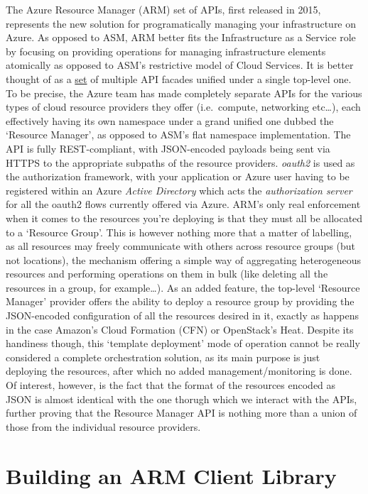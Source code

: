 \documentclass[11pt]{report}
\begin{document}
The Azure Resource Manager (ARM) set of APIs, first released in 2015,
represents the new solution for programatically managing your infrastructure on
Azure. As opposed to ASM, ARM better fits the Infrastructure as a Service
role by focusing on providing operations for managing infrastructure elements
atomically as opposed to ASM's restrictive model of Cloud Services. It is better
thought of as a \underline{set} of multiple API facades unified under a single
top-level one. To be precise, the Azure team has made completely separate APIs
for the various types of cloud resource providers they offer (i.e.\ compute,
networking etc\ldots), each effectively having its own namespace under a grand
unified one dubbed the `Resource Manager', as opposed to ASM's flat namespace
implementation. The API is fully REST-compliant, with JSON-encoded payloads
being sent via HTTPS to the appropriate subpaths of the resource providers.
\textit{oauth2} is used as the authorization framework, with your application
or Azure user having to be registered within an Azure \textit{Active
Directory} which acts the \textit{authorization server} for all the oauth2
flows currently offered via Azure. \newline
ARM's only real enforcement when it comes to the resources you're deploying is
that they must all be allocated to a `Resource Group'. This is however nothing
more that a matter of labelling, as all resources may freely communicate with
others across resource groups (but not locations), the mechanism offering a
simple way of aggregating heterogeneous resources and performing operations on
them in bulk (like deleting all the resources in a group, for example\ldots).
\newline
As an added feature, the top-level `Resource Manager' provider offers the
ability to deploy a resource group by providing the JSON-encoded configuration
of all the resources desired in it, exactly as happens in the case Amazon's
Cloud Formation (CFN) or OpenStack's Heat. Despite its handiness though, this
`template deployment' mode of operation cannot be really considered a complete
orchestration solution, as its main purpose is just deploying the resources,
after which no added management/monitoring is done. Of interest, however, is
the fact that the format of the resources encoded as JSON is almost identical
with the one thorugh which we interact with the APIs, further proving that the
Resource Manager API is nothing more than a union of those from the individual
resource providers.

\section{Building an ARM Client Library}
\end{document}
